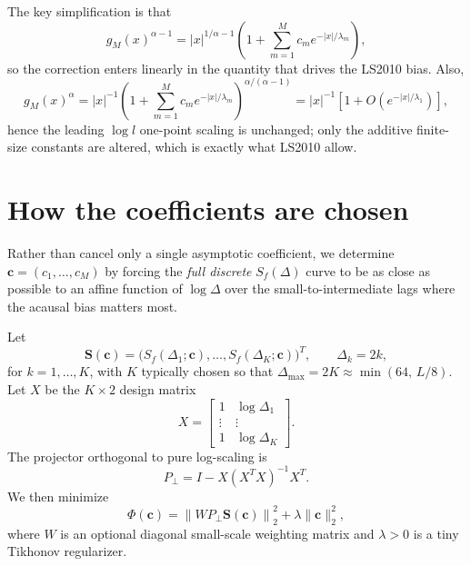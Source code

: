 \documentclass[11pt]{article}
\begin{document}
The key simplification is that
\begin{equation}
g_M(x)^{\alpha-1}
=
|x|^{1/\alpha-1}
\left(
1+\sum_{m=1}^{M} c_m e^{-|x|/\lambda_m}
\right),
\end{equation}
so the correction enters linearly in the quantity that drives the LS2010 bias.
Also,
\begin{equation}
g_M(x)^\alpha
=
|x|^{-1}
\left(
1+\sum_{m=1}^{M} c_m e^{-|x|/\lambda_m}
\right)^{\alpha/(\alpha-1)}
=
|x|^{-1}\left[1+O(e^{-|x|/\lambda_1})\right],
\end{equation}
hence the leading $\log l$ one-point scaling is unchanged; only the additive
finite-size constants are altered, which is exactly what LS2010 allow.

\section{How the coefficients are chosen}

Rather than cancel only a single asymptotic coefficient, we determine
\(
\bm c=(c_1,\dots,c_M)
\)
by forcing the \emph{full discrete} $S_f(\Delta)$ curve to be as close as possible
to an affine function of $\log \Delta$ over the small-to-intermediate lags where
the acausal bias matters most.

Let
\begin{equation}
\bm S(\bm c)
=
\bigl(S_f(\Delta_1;\bm c),\dots,S_f(\Delta_K;\bm c)\bigr)^T,
\qquad
\Delta_k = 2k,
\end{equation}
for \(k=1,\dots,K\), with \(K\) typically chosen so that
\(
\Delta_{\max}=2K \approx \min(64,\,L/8)
\).
Let \(X\) be the \(K\times 2\) design matrix
\begin{equation}
X=
\begin{bmatrix}
1 & \log \Delta_1\\
\vdots & \vdots\\
1 & \log \Delta_K
\end{bmatrix}.
\end{equation}
The projector orthogonal to pure log-scaling is
\begin{equation}
P_\perp
=
I - X(X^T X)^{-1}X^T.
\end{equation}
We then minimize
\begin{equation}
\Phi(\bm c)
=
\left\|W P_\perp \bm S(\bm c)\right\|_2^2
+
\lambda \|\bm c\|_2^2,
\end{equation}
where \(W\) is an optional diagonal small-scale weighting matrix and
\(\lambda>0\) is a tiny Tikhonov regularizer.
\end{document}
